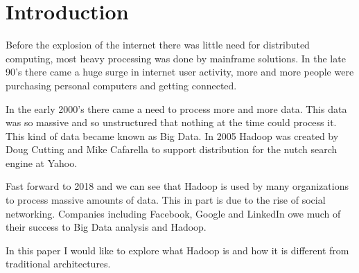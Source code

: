 \section{Introduction}
  
   Before the explosion of the internet there was little need for distributed computing, most heavy processing was done by mainframe solutions. In the late 90's there came a huge surge in internet user activity, more and more people were purchasing personal computers and getting connected.
   
In the early 2000's there came a need to process more and more data. This data was so massive and so unstructured that nothing at the time could process it. This kind of data became known as Big Data. In 2005 Hadoop was created by Doug Cutting and Mike Cafarella to support distribution for the nutch search engine at Yahoo.

Fast forward to 2018 and we can see that Hadoop is used by many organizations to process massive amounts of data. This in part is due to the rise of social networking. Companies including Facebook, Google and LinkedIn owe much of their success to Big Data analysis and Hadoop.

In this paper I would like to explore what Hadoop is and how it is different from traditional architectures.